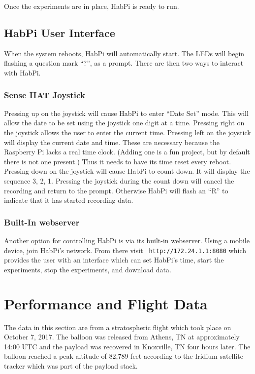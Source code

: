 \documentclass[journal]{new-aiaa}
\begin{document}
Once the experiments are in place, HabPi is ready to run.

\subsection{HabPi User Interface}
When the system reboots, HabPi will automatically start.  The LEDs
will begin flashing a question mark ``?'', as a prompt.  There are
then two ways to interact with HabPi. 

\subsubsection{Sense HAT Joystick}
Pressing up on the joystick will cause HabPi to enter ``Date Set''
mode.  This will allow the date to be set using the joystick one digit
at a time.  Pressing right on the joystick allows the user to enter
the current time.  Pressing left on the joystick will display the
current date and time.  These are necessary because the Raspberry Pi
lacks a real time clock.  (Adding one is a fun project, but by default
there is not one present.)  Thus it needs to have its time reset every
reboot. Pressing down on the joystick will cause HabPi to count down.
It will display the sequence 3, 2, 1.  Pressing the joystick during
the count down will cancel the recording and return to the prompt.
Otherwise HabPi will flash an ``R'' to indicate that it has started
recording data.

\subsubsection{Built-In webserver}
Another option for controlling HabPi is via its built-in webserver.
Using a mobile device, join HabPi's network.  From there visit {\tt
http://172.24.1.1:8080} which provides the user with an interface
which can set HabPi's time, start
the experiments, stop the experiments, and download data.

\section{Performance and Flight Data}
The data in this section are from a stratospheric flight which took
place on October 7, 2017.  The balloon was released from Athens, TN 
at approximately 14:00 UTC and the payload was recovered in 
Knoxville, TN four hours later.  The balloon reached a peak altitude
of 82,789 feet according to the Iridium satellite tracker which was
part of the payload stack.
\end{document}
